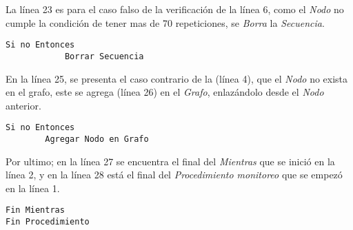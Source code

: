 La l\'inea 23 es para el caso falso de la verificaci\'on de la l\'inea 6, 
 como el \emph{Nodo} no cumple la condici\'on de tener mas de 70 
 repeticiones, se \emph{Borra} la \emph{Secuencia}.

\begin{tiny}
\begin{lstlisting}[style=C]		
        Si no Entonces
            Borrar Secuencia
\end{lstlisting}
\end{tiny}


En la l\'inea 25, se presenta el caso contrario de la (l\'inea 4), que el 
 \emph{Nodo} no exista en el grafo, este se agrega (l\'inea 26) en el 
 \emph{Grafo}, enlaz\'andolo desde el \emph{Nodo} anterior. 


\begin{tiny}
\begin{lstlisting}[style=C]
    Si no Entonces
        Agregar Nodo en Grafo
\end{lstlisting}
\end{tiny}


Por ultimo; en la l\'inea 27 se encuentra el final del \emph{Mientras} que se 
 inici\'o en la l\'inea 2, y en la l\'inea 28 est\'a el final del 
 \emph{Procedimiento monitoreo} que se empez\'o en la l\'inea 1.

\begin{tiny}
\begin{lstlisting}[style=C]
Fin Mientras
Fin Procedimiento 
\end{lstlisting}
\end{tiny}
